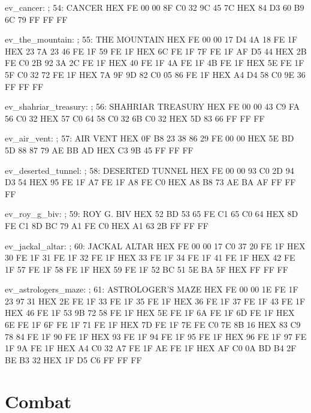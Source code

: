 \documentclass[10pt]{report}
\begin{document}
ev_cancer:                              ; 54: CANCER
    HEX FE 00 00 8F C0 32 9C 45 7C
    HEX 84 D3 60 B9 6C 79 FF FF FF

ev_the_mountain:                        ; 55: THE MOUNTAIN
    HEX FE 00 00 17 D4 4A 18 FE 1F
    HEX 23 7A 23 46 FE 1F 59 FE 1F
    HEX 6C FE 1F 7F FE 1F AF D5 44
    HEX 2B FE C0 2B 92 3A 2C FE 1F
    HEX 40 FE 1F 4A FE 1F 4B FE 1F
    HEX 5E FE 1F 5F C0 32 72 FE 1F
    HEX 7A 9F 9D 82 C0 05 86 FE 1F
    HEX A4 D4 58 C0 9E 36 FF FF FF

ev_shahriar_treasury:                   ; 56: SHAHRIAR TREASURY
    HEX FE 00 00 43 C9 FA 56 C0 32
    HEX 57 C0 64 58 C0 32 6B C0 32
    HEX 5D 83 66 FF FF FF

ev_air_vent:                            ; 57: AIR VENT
    HEX 0F B8 23 38 86 29 FE 00 00
    HEX 5E BD 5D 88 87 79 AE BB AD
    HEX C3 9B 45 FF FF FF

ev_deserted_tunnel:                     ; 58: DESERTED TUNNEL
    HEX FE 00 00 93 C0 2D 94 D3 54
    HEX 95 FE 1F A7 FE 1F A8 FE C0
    HEX A8 B8 73 AE BA AF FF FF FF

ev_roy_g_biv:                           ; 59: ROY G. BIV
    HEX 52 BD 53 65 FE C1 65 C0 64
    HEX 8D FE C1 8D BC 79 A1 FE C0
    HEX A1 63 2B FF FF FF

ev_jackal_altar:                        ; 60: JACKAL ALTAR
    HEX FE 00 00 17 C0 37 20 FE 1F
    HEX 30 FE 1F 31 FE 1F 32 FE 1F
    HEX 33 FE 1F 34 FE 1F 41 FE 1F
    HEX 42 FE 1F 57 FE 1F 58 FE 1F
    HEX 59 FE 1F 52 BC 51 5E BA 5F
    HEX FF FF FF

ev_astrologers_maze:                    ; 61: ASTROLOGER'S MAZE
    HEX FE 00 00 1E FE 1F 23 97 31
    HEX 2E FE 1F 33 FE 1F 35 FE 1F
    HEX 36 FE 1F 37 FE 1F 43 FE 1F
    HEX 46 FE 1F 53 9B 72 58 FE 1F
    HEX 5E FE 1F 6A FE 1F 6D FE 1F
    HEX 6E FE 1F 6F FE 1F 71 FE 1F
    HEX 7D FE 1F 7E FE C0 7E 8B 16
    HEX 83 C9 78 84 FE 1F 90 FE 1F
    HEX 93 FE 1F 94 FE 1F 95 FE 1F
    HEX 96 FE 1F 97 FE 1F 9A FE 1F
    HEX A4 C0 32 A7 FE 1F AE FE 1F
    HEX AF C0 0A BD B4 2F BE B3 32
    HEX 1F D5 C6 FF FF FF
\eatline
{}\nwendcode{}\nwdocspar

\chapter{Combat}
\end{document}
